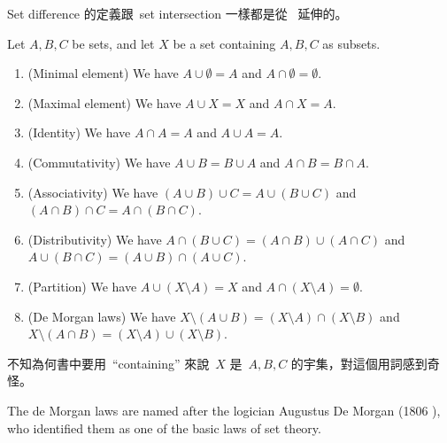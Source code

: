 \begin{note}
Set difference 的定義跟\ set intersection 一樣都是從\  延伸的。
\end{note}

\begin{proposition}  \label{prop 3.1.28} 
Let \(A, B, C\) be sets, and let \(X\) be a set containing \(A, B, C\) as subsets.
\begin{enumerate}
    \item (Minimal element) We have \(A \cup \emptyset = A\) and \(A \cap \emptyset = \emptyset\).
    \item (Maximal element) We have \(A \cup X = X\) and \(A \cap X = A\).
    \item (Identity) We have \(A \cap A = A\) and \(A \cup A = A\).
    \item (Commutativity) We have \(A \cup B = B \cup A\) and \(A \cap B = B \cap A\).
    \item (Associativity) We have \((A \cup B) \cup C = A \cup (B \cup C)\) and \((A \cap B) \cap C = A \cap (B \cap C)\).
    \item (Distributivity) We have \(A \cap (B \cup C) = (A \cap B) \cup (A \cap C)\) and \(A \cup (B \cap C) = (A \cup B) \cap (A \cup C)\).
    \item (Partition) We have \(A \cup (X \setminus A) = X\) and \(A \cap (X \setminus A) = \emptyset\).
    \item (De Morgan laws) We have \(X \setminus (A \cup B) = (X \setminus A) \cap (X \setminus B) \) and \(X \setminus (A \cap B) = (X \setminus A) \cup (X \setminus B)\).
\end{enumerate}
\end{proposition}

\begin{note}
不知為何書中要用\ ``containing'' 來說\ \(X\) 是\ \(A, B, C\) 的宇集，對這個用詞感到奇怪。
\end{note}

\begin{remark}\label{remark 3.1.29}
The de Morgan laws are named after the logician Augustus De Morgan (1806 ), who identified them as one of the basic laws of set theory.
\end{remark}

